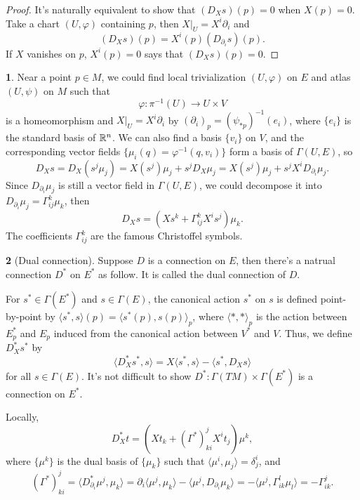 \documentclass[11pt]{article}
\theoremstyle{definition}
\newtheorem{para}{}[part]
\theoremstyle{plain}
\begin{document}
\begin{proof}
	It's naturally equivalent to show that $(D_Xs)(p)=0$ when $X(p)=0$. Take a chart $(U,\varphi)$ containing $p$, then $X|_U=X^i\partial_i$ and
	\[
		(D_Xs)(p)=X^i(p)(D_{\partial_i}s)(p).
	\]
	If $X$ vanishes on $p$, $X^i(p)=0$ says that $(D_Xs)(p)=0$.
\end{proof}

\begin{para}
Near a point $p\in M$, we could find local trivialization $(U,\varphi)$ on $E$ and atlas $(U,\psi)$ on $M$ such that
\[
	\varphi:\pi^{-1}(U)\to U\times V
\]
is a homeomorphism and $X|_U=X^i\partial_i$ by $(\partial_i)_p=(\psi_{*p})^{-1}(e_i)$, where $\{e_i\}$ is the standard basis of $\mathbb{R}^n$. We can also find a basis $\{v_i\}$ on $V$, and the corresponding vector fields $\{\mu_i(q)=\varphi^{-1}(q,v_i)\}$ form a basis of $\Gamma(U,E)$, so
\[
	D_Xs=D_{X}(s^j\mu_j)=X(s^j)\mu_j+s^jD_{X}\mu_j=X(s^j)\mu_j+s^jX^iD_{\partial_i}\mu_j.
\]
Since $D_{\partial_i}\mu_j$ is still a vector field in $\Gamma(U,E)$, we could decompose it into $D_{\partial_i}\mu_j=\Gamma_{ij}^k \mu_k$, then
\[
	D_Xs=\left(Xs^k+\Gamma_{ij}^kX^is^j\right)\mu_k.
\]
The coefficients $\Gamma_{ij}^k$ are the famous Christoffel symbols.
\end{para}

\begin{para}[Dual connection]
Suppose $D$ is a connection on $E$, then there's a natrual connection $D^*$ on $E^*$ as follow. It is called the dual connection of $D$.

For $s^*\in \Gamma(E^*)$ and $s\in \Gamma(E)$, the canonical action $s^*$ on $s$ is defined point-by-point by $\langle s^*,s\rangle(p)=\langle s^*(p),s(p)\rangle_p$, where $\langle *,* \rangle_p$ is the action between $E^*_p$ and $E_p$ induced from the canonical action between $V^*$ and $V$. Thus, we define $D^*_Xs^*$ by 
\[
	\langle D^*_Xs^*,s\rangle=X\langle s^*,s\rangle-\langle s^*,D_Xs\rangle
\]
for all $s\in \Gamma(E)$. It's not difficult to show $D^*:\Gamma(TM)\times \Gamma(E^*)$ is a connection on $E^*$. 

Locally, 
\[
	D^*_X t=\left(Xt_k+(\Gamma^*)_{ki}^{j}X^it_j\right)\mu^k,
\]
where $\{\mu^k\}$ is the dual basis of $\{\mu_k\}$ such that $\langle \mu^i,\mu_j\rangle=\delta^i_j$, and 
\[
	(\Gamma^*)_{ki}^{j}=\langle D^*_{\partial_i}\mu^j,\mu_k \rangle = \partial_i \langle \mu^j,\mu_k \rangle -\langle \mu^j, D_{\partial_i}\mu_k \rangle = -\langle \mu^j, \Gamma_{ik}^l\mu_l \rangle =-\Gamma_{ik}^j.
\]
\end{para}
\end{document}
